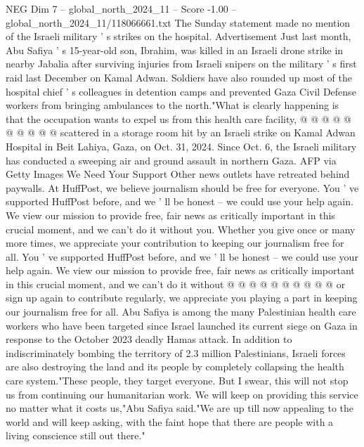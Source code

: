 \begin{textsample}{NEG Dim 7 – global\_north\_2024\_11 – Score -1.00 – global\_north\_2024\_11/118066661.txt}
The Sunday statement made no mention of the Israeli military ' s strikes on the hospital.
Advertisement Just last month, Abu Safiya ' s 15-year-old son, Ibrahim, was killed in an Israeli drone strike in nearby Jabalia after surviving injuries from Israeli snipers on the military ' s first raid last December on Kamal Adwan.
Soldiers have also rounded up most of the hospital chief ' s colleagues in detention camps and prevented Gaza Civil Defense workers from bringing ambulances to the north."What is clearly happening is that the occupation wants to expel us from this health care facility, @ @ @ @ @ @ @ @ @ @ scattered in a storage room hit by an Israeli strike on Kamal Adwan Hospital in Beit Lahiya, Gaza, on Oct. 31, 2024.
Since Oct. 6, the Israeli military has conducted a sweeping air and ground assault in northern Gaza.
AFP via Getty Images We Need Your Support Other news outlets have retreated behind paywalls.
At HuffPost, we believe journalism should be free for everyone.
You ' ve supported HuffPost before, and we ' ll be honest -- we could use your help again.
We view our mission to provide free, fair news as critically important in this crucial moment, and we can't do it without you.
Whether you give once or many more times, we appreciate your contribution to keeping our journalism free for all.
You ' ve supported HuffPost before, and we ' ll be honest -- we could use your help again.
We view our mission to provide free, fair news as critically important in this crucial moment, and we can't do it without @ @ @ @ @ @ @ @ @ @ or sign up again to contribute regularly, we appreciate you playing a part in keeping our journalism free for all.
Abu Safiya is among the many Palestinian health care workers who have been targeted since Israel launched its current siege on Gaza in response to the October 2023 deadly Hamas attack.
In addition to indiscriminately bombing the territory of 2.3 million Palestinians, Israeli forces are also destroying the land and its people by completely collapsing the health care system."These people, they target everyone.
But I swear, this will not stop us from continuing our humanitarian work.
We will keep on providing this service no matter what it costs us,"Abu Safiya said."We are up till now appealing to the world and will keep asking, with the faint hope that there are people with a living conscience still out there."

\end{textsample}
